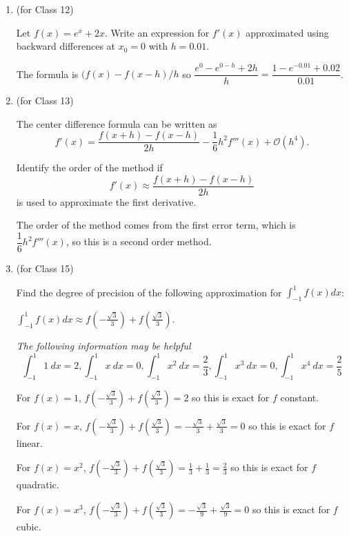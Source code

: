 \documentclass[12pt,letterpaper,answers]{exam}
\begin{document}
\begin{enumerate}
\item (for Class 12)

Let $f(x) = e^x+2x$.  Write an expression for $f'(x)$ approximated using backward differences at $x_0 = 0$ with $h = 0.01$.

\begin{solution}
 The formula is $(f(x) - f(x-h)/h$ so $\dfrac{e^0 -e^{0-h}+2h}{h}=\dfrac{1-e^{-0.01}+0.02}{0.01}$.
 
\end{solution}

\item (for Class 13)

The center difference formula can be written as \[f'(x) = \dfrac{f(x+h)-f(x-h)}{2h} - \dfrac{1}{6}h^2 f'''(x) + \mathcal{O}(h^4).\]  

Identify the order of the method if 
\[f'(x) \approx  \dfrac{f(x+h)-f(x-h)}{2h}\]
is used to approximate the first derivative.

\begin{solution}
The order of the method comes from the first error term, which is $\dfrac{1}{6}h^2 f'''(x)$, so this is a second order method.
\end{solution}


\setcounter{enumi}{14}
\item (for Class 15)

Find the degree of precision of the following approximation for $\displaystyle\int_{-1}^1 f(x)dx$:

$\displaystyle\int_{-1}^1 f(x)dx\approx f\left(-\frac{\sqrt{3}}{3}\right)+f\left(\frac{\sqrt{3}}{3}\right)$.

\emph{The following information may be helpful}
\[\int_{-1}^1 1\ dx = 2, \int_{-1}^1 x\ dx = 0, \int_{-1}^1 x^2\ dx = \frac{2}{3}, \int_{-1}^1 x^3\ dx =0, \int_{-1}^1 x^4\ dx = \frac{2}{5}\]

\begin{solution}
For $f(x) = 1$, $f\left(-\frac{\sqrt{3}}{3}\right)+f\left(\frac{\sqrt{3}}{3}\right) = 2$ so this is exact for $f$ constant.

For $f(x) = x$, $f\left(-\frac{\sqrt{3}}{3}\right)+f\left(\frac{\sqrt{3}}{3}\right) = -\frac{\sqrt{3}}{3}+\frac{\sqrt{3}}{3}=0$ so this is exact for $f$ linear.

For $f(x) = x^2$, $f\left(-\frac{\sqrt{3}}{3}\right)+f\left(\frac{\sqrt{3}}{3}\right) = \frac{1}{3}+\frac{1}{3}=\frac{2}{3}$ so this is exact for $f$ quadratic.

For $f(x) = x^3$, $f\left(-\frac{\sqrt{3}}{3}\right)+f\left(\frac{\sqrt{3}}{3}\right) = -\frac{\sqrt{3}}{9}+\frac{\sqrt{3}}{9}=0$ so this is exact for $f$ cubic.


\end{solution}
\end{enumerate}
\end{document}
